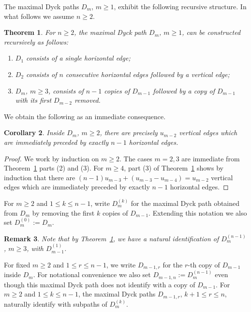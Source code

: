 \documentclass{amsart}
\newtheorem{theorem}{Theorem}[section]
\newtheorem{corollary}[theorem]{Corollary}
\newtheorem{remark}[theorem]{Remark}
\numberwithin{equation}{section}
\begin{document}
The maximal Dyck paths $D_m$, $m\ge1$, exhibit the following recursive structure.
In what follows we assume $n\ge2$.
\begin{theorem}
  \cite[Corollary 2.4]{rupel}
  \label{th:dyck path recursion}
  For $n\ge2$, the maximal Dyck path $D_m$, $m\ge1$, can be constructed recursively as follows:
  \begin{enumerate}
    \item $D_1$ consists of a single horizontal edge;
    \item $D_2$ consists of $n$ consecutive horizontal edges followed by a vertical edge;
    \item $D_m$, $m\ge3$, consists of $n-1$ copies of $D_{m-1}$ followed by a copy of $D_{m-1}$ with its first $D_{m-2}$ removed.
  \end{enumerate}
\end{theorem}

We obtain the following as an immediate consequence.
\begin{corollary}
  \label{cor:short hooks}
  Inside $D_m$, $m\ge2$, there are precisely $u_{m-2}$ vertical edges which are immediately preceded by exactly $n-1$ horizontal edges.
\end{corollary}
\begin{proof}
  We work by induction on $m\ge2$.
  The cases $m=2,3$ are immediate from Theorem~\ref{th:dyck path recursion} parts (2) and (3).
  For $m\ge4$, part (3) of Theorem~\ref{th:dyck path recursion} shows by induction that there are $(n-1)u_{m-3}+(u_{m-3}-u_{m-4})=u_{m-2}$ vertical edges which are immediately preceded by exactly $n-1$ horizontal edges.
\end{proof}

For $m\ge2$ and $1\le k\le n-1$, write $D_m^{(k)}$ for the maximal Dyck path obtained from $D_m$ by removing the first $k$ copies of $D_{m-1}$.
Extending this notation we also set $D_m^{(0)}:=D_m$.
\begin{remark}
  Note that by Theorem~\ref{th:dyck path recursion}, we have a natural identification of $D_m^{(n-1)}$, $m\ge3$, with $D_{m-1}^{(1)}$.
\end{remark}
For fixed $m\ge2$ and $1\le r\le n-1$, we write $D_{m-1,r}$ for the $r$-th copy of $D_{m-1}$ inside $D_m$.
For notational convenience we also set $D_{m-1,n}:=D_m^{(n-1)}$ even though this maximal Dyck path does not identify with a copy of $D_{m-1}$.
For $m\ge2$ and $1\le k\le n-1$, the maximal Dyck paths $D_{m-1,r}$, $k+1\le r\le n$, naturally identify with subpaths of $D_m^{(k)}$.
\end{document}
